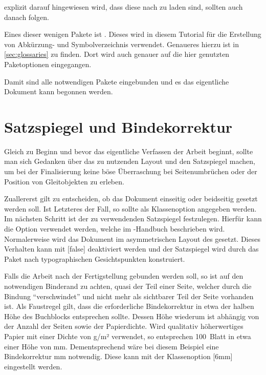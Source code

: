 \documentclass[%
  english,ngerman,%
  geometry=no,DIV=12,automark,%
]{tudscrartcl}
\begin{document}
explizit darauf hingewiesen wird, dass diese nach  zu laden 
sind, sollten auch danach folgen.
%
\begin{Excerpt*}
\usepackage[colorlinks,linkcolor=blue]{hyperref}
\end{Excerpt*}
%
Eines dieser wenigen Pakete ist . Dieses wird in diesem 
Tutorial für die Erstellung von Abkürzung- und Symbolverzeichnis verwendet. 
Genaueres hierzu ist in \autoref{sec:glossaries} zu finden. Dort wird auch 
genauer auf die hier genutzten Paketoptionen eingegangen.
%
\begin{Excerpt*}
\usepackage[%
  automake,%
  acronym,%
  symbols,%
  nomain,%
  translate=babel,%
  nogroupskip,%
  toc,%
  section=section,%
]{glossaries}
\makeglossaries
\end{Excerpt*}
%
Damit sind alle notwendigen Pakete eingebunden und es das eigentliche Dokument 
kann begonnen werden.
\begin{Excerpt*}
\begin{document}
\end{Excerpt*}



\section{Satzspiegel und Bindekorrektur}
Gleich zu Beginn und bevor das eigentliche Verfassen der Arbeit beginnt, sollte 
man sich Gedanken über das zu nutzenden Layout und den Satzspiegel machen, um 
bei der Finalisierung keine böse Überraschung bei Seitenumbrüchen oder der 
Position von Gleitobjekten zu erleben.

Zuallererst gilt zu entscheiden, ob das Dokument einseitig oder beidseitig 
gesetzt werden soll. Ist Letzteres der Fall, so sollte  als 
Klassenoption angegeben werden. Im nächsten Schritt ist der zu verwendenden 
Satzspiegel festzulegen. Hierfür kann die Option  verwendet 
werden, welche im \TUDScript-Handbuch beschrieben wird. Normalerweise wird das 
Dokument im asymmetrischen Layout des \CDs gesetzt. Dieses Verhalten kann mit 
[false] deaktiviert werden und der Satzspiegel wird durch das 
Paket  nach typographischen Gesichtspunkten konstruiert.

Falls die Arbeit nach der Fertigstellung gebunden werden soll, so ist auf den 
notwendigen Binderand zu achten, quasi der Teil einer Seite, welcher durch die 
Bindung \enquote{verschwindet} und nicht mehr als sichtbarer Teil der Seite 
vorhanden ist. Als Faustregel gilt, dass die erforderliche Bindekorrektur in 
etwa der halben Höhe des Buchblocks entsprechen sollte. Dessen Höhe wiederum 
ist abhängig von der Anzahl der Seiten sowie der Papierdichte. Wird qualitativ 
höherwertiges Papier mit einer Dichte von \unit[100]{g/m²} verwendet, so 
entsprechen 100~Blatt in etwa einer Höhe von \unit[12]{mm}. Dementsprechend 
wäre bei diesem Beispiel eine Bindekorrektur \unit[6]{mm} notwendig. Diese 
kann mit der Klassenoption [6mm] eingestellt werden.
\end{document}
